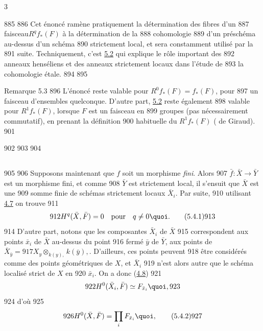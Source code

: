 3	\documentclass[10pt]{../fichiers-configuration-latex/smfart}
\begin{document}
   885	
   886	Cet énoncé ramène pratiquement la détermination des fibres d'un
   887	faisceau\pageoriginale $R^q f_{\ast}(F)$ à la détermination de la
   888	cohomologie
   889	d'un préschéma au-dessus d'un schéma
   890	strictement local, et sera constamment utilisé par la
   891	suite. Techniquement, c'est \hyperref[VIII.thm5.2]{5.2} qui explique le rôle important des
   892	anneaux henséliens et des anneaux strictement locaux dans l'étude de
   893	la cohomologie étale.
   894	
   895	\begin{enonce*}[remark]{Remarque 5.3}
   896	L'énoncé reste valable pour $R^{0} f_{\ast} (F) = f_{\ast} (F)$, pour
   897	un faisceau d'ensembles quelconque. D'autre part, \hyperref[VIII.thm5.2]{5.2} reste également
   898	valable pour $R^{1} f_{\ast} (F)$, lorsque $F$ est un faisceau en
   899	groupes (pas nécessairement commutatif), en prenant la définition
   900	habituelle du $R^1 f_{\ast} (F)$ (\cf {} de Giraud).
   901	\end{enonce*}
   902	
   903	\setcounter{subsection}{3}
   904	\subsection{}
   905	
   906	Supposons maintenant que $f$ soit un morphisme \emph{fini}. Alors
   907	$\bar{f} : \bar{X} \to \bar{Y}$ est un morphisme fini, et comme
   908	$\bar{Y}$ est strictement local, il s'ensuit que $\bar{X}$ est une
   909	somme finie de schémas strictement locaux $\bar{X}_i$. Par suite,
   910	utilisant \hyperref[VIII.cor4.7]{4.7} on trouve
   911	\begin{equation*}
   912	H^q (\bar{X}, \bar{F}) = 0\quad \mbox{pour}\quad q \neq 0{\quoi}.\tag{5.4.1}
   913	\end{equation*}
   914	D'autre part, notons que les composantes $\bar{X}_i$ de $\bar{X}$
   915	correspondent aux points $\bar{x}_i$ de $\bar{X}$ au-dessus du point
   916	fermé $\bar{y}$ de $\bar{Y}$, \ie aux points de $\bar{X}_{\bar{y}} =
   917	X_{y} \otimes_{k(y),} k(\bar{y}),$. D'ailleurs, ces points peuvent
   918	être considérés comme des points géométriques de $X$, et $\bar{X}_i$
   919	n'est alors autre que le schéma localisé strict de $X$ en
   920	$\bar{x}_i$. On a donc (\hyperref[VIII.cor4.8]{4.8})
   921	$$
   922	H^0 (\bar{X}_i, \bar{F}) \simeq F_{\bar{x}_i}{\quoi},
   923	$$
   924	d'où
   925	\begin{equation*}
   926	H^0 (\bar{X}, \bar{F}) = \mathop{\prod}_i F_{\bar{x}_i}{\quoi},\tag{5.4.2}
   927	\end{equation*}
\end{document}
